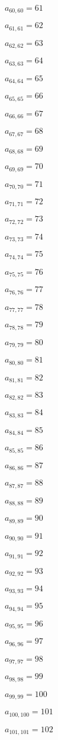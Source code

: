 \documentclass[a4paper,12pt]{article}
\begin{document}
$a _{ 60, 60 } = 61$

$a _{ 61, 61 } = 62$

$a _{ 62, 62 } = 63$

$a _{ 63, 63 } = 64$

$a _{ 64, 64 } = 65$

$a _{ 65, 65 } = 66$

$a _{ 66, 66 } = 67$

$a _{ 67, 67 } = 68$

$a _{ 68, 68 } = 69$

$a _{ 69, 69 } = 70$

$a _{ 70, 70 } = 71$

$a _{ 71, 71 } = 72$

$a _{ 72, 72 } = 73$

$a _{ 73, 73 } = 74$

$a _{ 74, 74 } = 75$

$a _{ 75, 75 } = 76$

$a _{ 76, 76 } = 77$

$a _{ 77, 77 } = 78$

$a _{ 78, 78 } = 79$

$a _{ 79, 79 } = 80$

$a _{ 80, 80 } = 81$

$a _{ 81, 81 } = 82$

$a _{ 82, 82 } = 83$

$a _{ 83, 83 } = 84$

$a _{ 84, 84 } = 85$

$a _{ 85, 85 } = 86$

$a _{ 86, 86 } = 87$

$a _{ 87, 87 } = 88$

$a _{ 88, 88 } = 89$

$a _{ 89, 89 } = 90$

$a _{ 90, 90 } = 91$

$a _{ 91, 91 } = 92$

$a _{ 92, 92 } = 93$

$a _{ 93, 93 } = 94$

$a _{ 94, 94 } = 95$

$a _{ 95, 95 } = 96$

$a _{ 96, 96 } = 97$

$a _{ 97, 97 } = 98$

$a _{ 98, 98 } = 99$

$a _{ 99, 99 } = 100$

$a _{ 100, 100 } = 101$

$a _{ 101, 101 } = 102$
\end{document}
